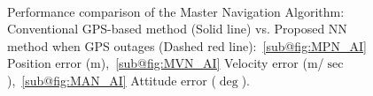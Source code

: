 \documentclass[3p]{elsarticle}
\begin{document}
\begin{figure}[H]
{	}\\
	\caption{%
Performance comparison of the Master Navigation Algorithm: Conventional GPS-based method (Solid line) vs. Proposed NN method when GPS outages (Dashed red line):~\ref{sub@fig:MPN_AI} Position error (m),~\ref{sub@fig:MVN_AI} Velocity error (m/\(\sec\)),~\ref{sub@fig:MAN_AI} Attitude error (\(\deg\)).
}
\label{fig:AI_master}
\end{figure}
\end{document}
